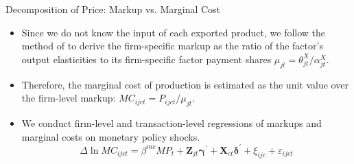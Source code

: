 \documentclass[10pt]{beamer}
\begin{document}
\begin{frame}{Decomposition of Price: Markup vs. Marginal Cost}
    \begin{itemize}
        \item Since we do not know the input of each exported product, we follow the method of \cite{dlw2012} to derive the firm-specific markup as the ratio of the factor’s output elasticities to its firm-specific factor payment shares $\mu_{jt}=\theta_{jt}^{X}/\alpha_{jt}^{X}$.
        \item Therefore, the marginal cost of production is estimated as the unit value over the firm-level markup: $MC_{ijct}=P_{ijct}/\mu_{jt}$.
        \item We conduct firm-level and transaction-level regressions of markups and marginal costs on monetary policy shocks.
        \begin{equation}
            \Delta \ln MC_{ijct}=\beta^{mc} M P_{t} + \mathbf{Z}_{jt} \boldsymbol{\gamma}^{\prime}+\mathbf{X}_{ct} \boldsymbol{\delta}^{\prime} +\xi_{i j c} + \varepsilon_{ijct}
    	\label{eq.mc}
        \end{equation}
    \end{itemize}
\end{frame}
\end{document}

